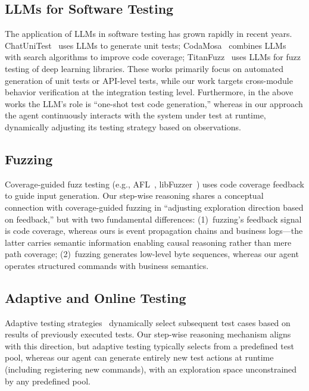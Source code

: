 \documentclass[sigconf,nonacm]{acmart}
\begin{document}
\subsection{LLMs for Software Testing}

The application of LLMs in software testing has grown rapidly in recent years. ChatUniTest~\cite{chen2023chatunitest} uses LLMs to generate unit tests; CodaMosa~\cite{lemieux2023codamosa} combines LLMs with search algorithms to improve code coverage; TitanFuzz~\cite{deng2023titanfuzz} uses LLMs for fuzz testing of deep learning libraries. These works primarily focus on automated generation of unit tests or API-level tests, while our work targets cross-module behavior verification at the integration testing level. Furthermore, in the above works the LLM's role is ``one-shot test code generation,'' whereas in our approach the agent continuously interacts with the system under test at runtime, dynamically adjusting its testing strategy based on observations.

\subsection{Fuzzing}

Coverage-guided fuzz testing (e.g., AFL~\cite{zalewski2014afl}, libFuzzer~\cite{llvm2023libfuzzer}) uses code coverage feedback to guide input generation. Our step-wise reasoning shares a conceptual connection with coverage-guided fuzzing in ``adjusting exploration direction based on feedback,'' but with two fundamental differences: (1)~fuzzing's feedback signal is code coverage, whereas ours is event propagation chains and business logs---the latter carries semantic information enabling causal reasoning rather than mere path coverage; (2)~fuzzing generates low-level byte sequences, whereas our agent operates structured commands with business semantics.

\subsection{Adaptive and Online Testing}

Adaptive testing strategies~\cite{afzal2009sbst,arcuri2011art} dynamically select subsequent test cases based on results of previously executed tests. Our step-wise reasoning mechanism aligns with this direction, but adaptive testing typically selects from a predefined test pool, whereas our agent can generate entirely new test actions at runtime (including registering new commands), with an exploration space unconstrained by any predefined pool.
\end{document}
